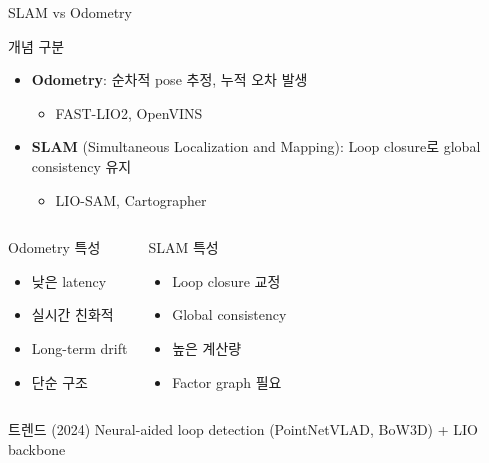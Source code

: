 \begin{frame}{SLAM vs Odometry}
  \begin{block}{개념 구분}
    \begin{itemize}
      \item \textbf{Odometry}: 순차적 pose 추정, 누적 오차 발생
        \begin{itemize}
          \item FAST-LIO2, OpenVINS
        \end{itemize}
      \item \textbf{SLAM} (Simultaneous Localization and Mapping):
        Loop closure로 global consistency 유지
        \begin{itemize}
          \item LIO-SAM, Cartographer
        \end{itemize}
    \end{itemize}
  \end{block}
  \pause
  \begin{columns}
    \begin{block}{Odometry 특성}
      \begin{itemize}
        \item 낮은 latency
        \item 실시간 친화적
        \item Long-term drift
        \item 단순 구조
      \end{itemize}
    \end{block}
    \begin{block}{SLAM 특성}
      \begin{itemize}
        \item Loop closure 교정
        \item Global consistency
        \item 높은 계산량
        \item Factor graph 필요
      \end{itemize}
    \end{block}
  \end{columns}
  \pause
  \begin{exampleblock}{트렌드 (2024)}
    Neural-aided loop detection (PointNetVLAD, BoW3D) + LIO backbone
  \end{exampleblock}
\end{frame}

